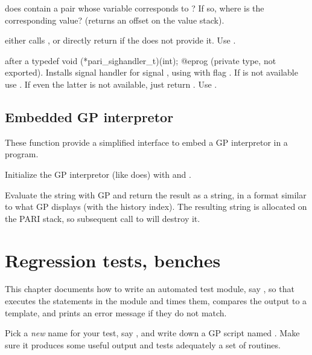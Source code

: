  does  contain
a pair whose variable corresponds to ? If so, where is the
corresponding value? (returns an offset on the value stack).


 either calls , or directly
return  if the  does not provide it. Use .

 after a
\bprog
  typedef void (*pari_sighandler_t)(int);
@eprog\noindent
(private type, not exported). Installs signal handler  for
signal , using  with flag . If
 is not available use . If even the latter is not
available, just return . Use .

\section{Embedded GP interpretor}
These function provide a simplified interface to embed a GP
interpretor in a program.

Initialize the GP interpretor (like  does) with
  and .

Evaluate the string  with GP and return the result as a string,
in a format similar to what GP displays (with the history index).
The resulting string is allocated on the PARI stack, so subsequent call
to  will destroy it.

\chapter{Regression tests, benches}

This chapter documents how to write an automated test module, say ,
so that  executes the statements in the  module
and times them, compares the output to a template, and prints an error
message if they do not match.

\item Pick a \emph{new} name for your test, say , and write down a
GP script named . Make sure it produces some useful output and tests
adequately a set of routines.

